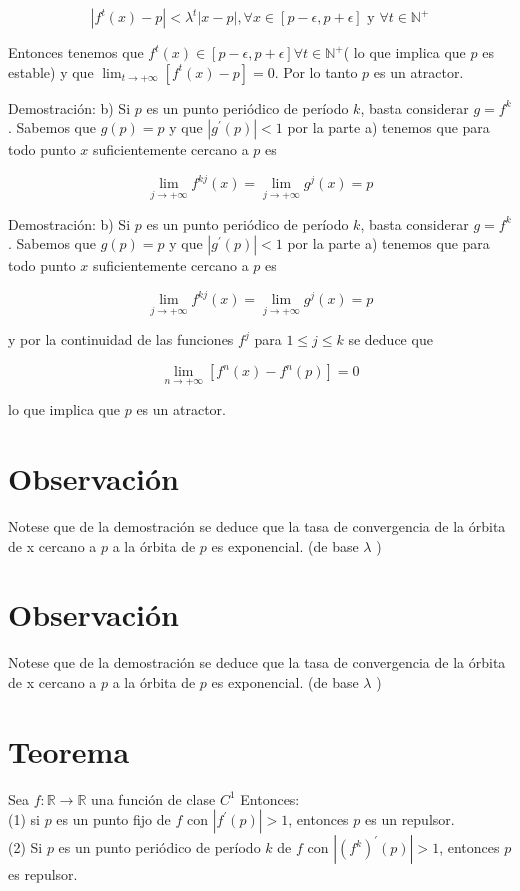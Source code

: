 \documentclass[11pt]{beamer}
\begin{document}
$$
\left|f^{t}(x)-p\right|<\lambda^{t}|x-p|, \forall x \in[p-\epsilon, p+\epsilon] \text { y } \forall t \in \mathbb{N}^{+}
$$

Entonces tenemos que $f^{t}(x) \in[p-\epsilon, p+\epsilon] \forall t \in \mathbb{N}^{+}$( lo que implica que $p$ es estable) y que $\lim _{t \rightarrow+\infty}\left[f^{t}(x)-p\right]=0$. Por lo tanto $p$ es un atractor.

Demostración: b) Si $p$ es un punto periódico de período $k$, basta considerar $g=f^{k}$. Sabemos que $g(p)=p$ y que $\left|g^{\prime}(p)\right|<1$ por la parte a) tenemos que para todo punto $x$ suficientemente cercano a $p$ es

$$
\lim _{j \rightarrow+\infty} f^{k j}(x)=\lim _{j \rightarrow+\infty} g^{j}(x)=p
$$

Demostración: b) Si $p$ es un punto periódico de período $k$, basta considerar $g=f^{k}$. Sabemos que $g(p)=p$ y que $\left|g^{\prime}(p)\right|<1$ por la parte a) tenemos que para todo punto $x$ suficientemente cercano a $p$ es

$$
\lim _{j \rightarrow+\infty} f^{k j}(x)=\lim _{j \rightarrow+\infty} g^{j}(x)=p
$$

y por la continuidad de las funciones $f^{j}$ para $1 \leq j \leq k$ se deduce que

$$
\lim _{n \rightarrow+\infty}\left[f^{n}(x)-f^{n}(p)\right]=0
$$

lo que implica que $p$ es un atractor.

\section*{Observación}
Notese que de la demostración se deduce que la tasa de convergencia de la órbita de x cercano a $p$ a la órbita de $p$ es exponencial. (de base $\lambda$ )

\section*{Observación}
Notese que de la demostración se deduce que la tasa de convergencia de la órbita de x cercano a $p$ a la órbita de $p$ es exponencial. (de base $\lambda$ )

\section*{Teorema}
Sea $f: \mathbb{R} \rightarrow \mathbb{R}$ una función de clase $C^{1}$ Entonces:\\
(1) si $p$ es un punto fijo de $f$ con $\left|f^{\prime}(p)\right|>1$, entonces $p$ es un repulsor.\\
(2) Si $p$ es un punto periódico de período $k$ de $f$ con $\left|\left(f^{k}\right)^{\prime}(p)\right|>1$, entonces $p$ es repulsor.
\end{document}
